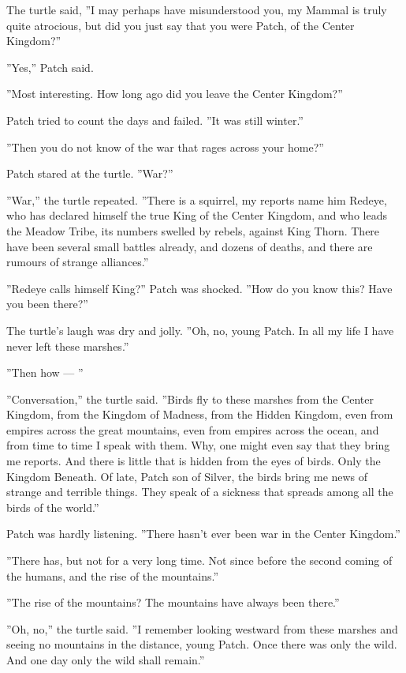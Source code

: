 \documentclass[12pt]{book}
\begin{document}
The turtle said, ''I may perhaps have misunderstood you, my Mammal is truly quite atrocious, but did you just say that you were Patch, of the Center Kingdom?''

''Yes,'' Patch said.

''Most interesting. How long ago did you leave the Center Kingdom?''

Patch tried to count the days and failed. ''It was still winter.''

''Then you do not know of the war that rages across your home?''

Patch stared at the turtle. ''War?''

''War,'' the turtle repeated. ''There is a squirrel, my reports name him Redeye, who has declared himself the true King of the Center Kingdom, and who leads the Meadow Tribe, its numbers swelled by rebels, against King Thorn. There have been several small battles already, and dozens of deaths, and there are rumours of strange alliances.''

''Redeye calls himself King?'' Patch was shocked. ''How do you know this? Have you been there?''

The turtle's laugh was dry and jolly. ''Oh, no, young Patch. In all my life I have never left these marshes.''

''Then how ---
''

''Conversation,'' the turtle said. ''Birds fly to these marshes from the Center Kingdom, from the Kingdom of Madness, from the Hidden Kingdom, even from empires across the great mountains, even from empires across the ocean, and from time to time I speak with them. Why, one might even say that they bring me reports. And there is little that is hidden from the eyes of birds. Only the Kingdom Beneath. Of late, Patch son of Silver, the birds bring me news of strange and terrible things. They speak of a sickness that spreads among all the birds of the world.''

Patch was hardly listening. ''There hasn't ever been war in the Center Kingdom.''

''There has, but not for a very long time. Not since before the second coming of the humans, and the rise of the mountains.''

''The rise of the mountains? The mountains have always been there.''

''Oh, no,'' the turtle said. ''I remember looking westward from these marshes and seeing no mountains in the distance, young Patch. Once there was only the wild. And one day only the wild shall remain.''
\end{document}

